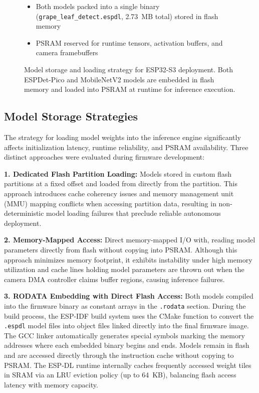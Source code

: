 \begin{figure}[htbp]
\vspace{0.25cm}

\begin{itemize}\itemsep2pt
    \item Both models packed into a single binary (\texttt{grape\_leaf\_detect.espdl}, 2.73~MB total) stored in flash memory
    \item PSRAM reserved for runtime tensors, activation buffers, and camera framebuffers
  
\end{itemize}

\caption{\small Model storage and loading strategy for ESP32-S3 deployment. Both ESPDet-Pico and MobileNetV2 models are embedded in flash memory and loaded into PSRAM at runtime for inference execution.}
\label{fig:model_storage_strategy}
\end{figure}

\subsection*{Model Storage Strategies}
\label{subsec:model_storage}

The strategy for loading model weights into the inference engine significantly affects initialization latency, runtime reliability, and PSRAM availability. Three distinct approaches were evaluated during firmware development:

\textbf{1. Dedicated Flash Partition Loading:} Models stored in custom flash partitions at a fixed offset and loaded from directly from the partition. This approach introduces cache coherency issues and memory management unit (MMU) mapping conflicts when accessing partition data, resulting in non-deterministic model loading failures that preclude reliable autonomous deployment.

\textbf{2. Memory-Mapped Access:} Direct memory-mapped I/O with, reading model parameters directly from flash without copying into PSRAM. Although this approach minimizes memory footprint, it exhibits instability under high memory utilization and cache lines holding model parameters are thrown out when the camera DMA controller claims buffer regions, causing inference failures.

\textbf{3. RODATA Embedding with Direct Flash Access:} Both models compiled into the firmware binary as constant arrays in the \texttt{.rodata} section. During the build process, the ESP-IDF build system uses the CMake function to convert the \texttt{.espdl} model files into object files linked directly into the final firmware image. The GCC linker automatically generates special symbols marking the memory addresses where each embedded binary begins and ends.  Models remain in flash and are accessed directly through the instruction cache without copying to PSRAM. The ESP-DL runtime internally caches frequently accessed weight tiles in SRAM via an LRU eviction policy (up to 64~KB), balancing flash access latency with memory capacity.



